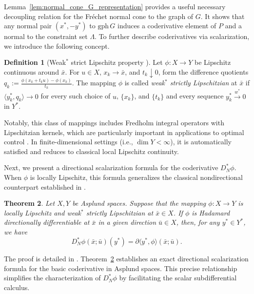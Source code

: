 \documentclass[12pt,twoside,reqno]{amsart}
\newtheorem{theorem}{Theorem}[section]
\theoremstyle{definition}
\newtheorem{definition}[theorem]{Definition}
\numberwithin{equation}{section}
\begin{document}
Lemma~\ref{lem:normal_cone_G_representation} provides a useful necessary decoupling relation for the Fr\'echet normal cone to the graph of $G$. It shows that any normal pair $(x^*, -y^*)$ to $\mathrm{gph}\, G$ induces a coderivative element of $P$ and a normal to the constraint set $\Lambda$. To further describe coderivatives via scalarization, we introduce the following concept. 

\begin{definition}[Weak\(^*\) strict Lipschitz property {\cite[Definition~3.25]{Mordukhovich2006variational}}] \label{defn:weak_strict_lip}
Let $\phi:X\to Y$ be Lipschitz continuous around $\bar{x}$. For $u\in X$, $x_k\to\bar{x}$, and $t_k\downarrow0$, form the difference quotients $q_k:=\frac{\phi(x_k+t_ku)-\phi(x_k)}{t_k}$. 
The mapping $\phi$ is called \emph{weak\(^*\) strictly Lipschitzian} at $\bar{x}$ if $\langle y_k^*,q_k\rangle\to0$ for every such choice of $u$, $\{x_k\}$, and $\{t_k\}$ and every sequence $y_k^*\xrightarrow{w^*}0$ in $Y^*$.
\end{definition}

Notably, this class of mappings includes Fredholm integral operators with Lipschitzian kernels, which are particularly important in applications to optimal control \cite[p.~288]{Mordukhovich2006variational}. In finite-dimensional settings (i.e., $\dim Y < \infty$), it is automatically satisfied and reduces to classical local Lipschitz continuity. 

Next, we present a directional scalarization formula for the coderivative $D_N^* \phi$. When $\phi$ is locally Lipschitz, this formula generalizes the classical nondirectional counterpart established in \cite[Theorem~3.28]{Mordukhovich2006variational}. 

\begin{theorem} \label{thm:scalarization}
Let $X,Y$ be Asplund spaces. Suppose that the mapping $\phi: X \to Y$ is locally Lipschitz and weak\(^*\) strictly Lipschitzian at $\bar{x} \in X$. If $\phi$ is Hadamard directionally differentiable at $\bar{x}$ in a given direction $\bar{u} \in X$, then, for any $y^* \in Y^*$, we have
\begin{equation} \label{eq:scalarization_formula}
    D_N^* \phi(\bar{x}; \bar{u})(y^*) = \partial \langle y^*, \phi \rangle (\bar{x}; \bar{u}).
\end{equation}
\end{theorem}

The proof is detailed in \cite[Theorem 3.10]{mao2025directional}. 
Theorem~\ref{thm:scalarization} establishes an exact directional scalarization formula for the basic coderivative in Asplund spaces. This precise relationship simplifies the characterization of $D_N^* \phi$ by facilitating the scalar subdifferential calculus. 
\end{document}
